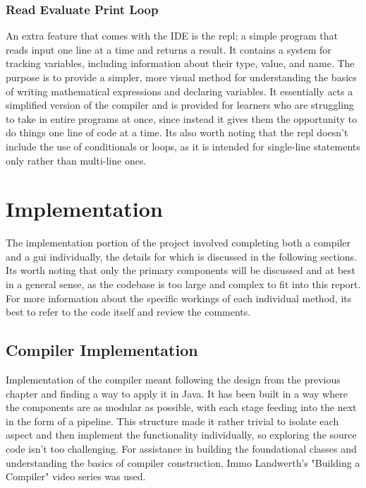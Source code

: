 \documentclass[
]{report}
\begin{document}
\subsection{Read Evaluate Print Loop}
An extra feature that comes with the IDE is the \acrshort{repl}; a simple program
that reads input one line at a time and returns a result. It contains a
system for tracking variables, including information about their type,
value, and name. The purpose is to provide a simpler, more visual method
for understanding the basics of writing mathematical \glspl{expression} and
declaring variables. It essentially acts a simplified version of the
compiler and is provided for learners who are struggling to take in
entire programs at once, since instead it gives them the opportunity to
do things one line of code at a time. Its also worth noting that the
\acrshort{repl} doesn't include the use of conditionals or loops, as it is intended
for single-line \glspl{statement} only rather than multi-line ones.

\chapter{Implementation}
The implementation portion of the project involved completing both a
compiler and a \acrshort{gui} individually, the details for which is discussed in
the following sections. Its worth noting that only the primary
components will be discussed and at best in a general sense, as the
codebase is too large and complex to fit into this report. For more
information about the specific workings of each individual method, its
best to refer to the code itself and review the comments.

\section{Compiler Implementation}
Implementation of the compiler meant following the design from the
previous chapter and finding a way to apply it in Java. It has been
built in a way where the components are as modular as possible, with
each stage feeding into the next in the form of a pipeline. This
structure made it rather trivial to isolate each aspect and then
implement the functionality individually, so exploring the source code
isn't too challenging. For assistance in building the foundational classes
and understanding the basics of compiler construction, Immo Landwerth's "Building
a Compiler" video series \cite{compiler-video} was used.
\end{document}
